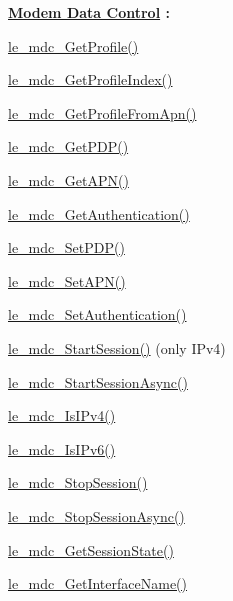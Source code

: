 {\bfseries \hyperlink{c_mdc}{Modem Data Control} \+:}
\begin{DoxyItemize}
\item \hyperlink{le__mdc__interface_8h_a638b693cd5f644fa5c24f81e1e36483c}{le\+\_\+mdc\+\_\+\+Get\+Profile()}
\item \hyperlink{le__mdc__interface_8h_a108f7c3db74a377c2ae5482543d4e0d9}{le\+\_\+mdc\+\_\+\+Get\+Profile\+Index()}
\item \hyperlink{le__mdc__interface_8h_a2ea0573e6e9cd16c04e95146f2b2e693}{le\+\_\+mdc\+\_\+\+Get\+Profile\+From\+Apn()}
\item \hyperlink{le__mdc__interface_8h_a0a51125579f1d5009dac03c79ddff498}{le\+\_\+mdc\+\_\+\+Get\+P\+D\+P()}
\item \hyperlink{le__mdc__interface_8h_afc0c149bfa4455f3e9a8ccc06f0c5fed}{le\+\_\+mdc\+\_\+\+Get\+A\+P\+N()}
\item \hyperlink{le__mdc__interface_8h_a3f83b1b922271091e3f1da418a4f39ca}{le\+\_\+mdc\+\_\+\+Get\+Authentication()}
\item \hyperlink{le__mdc__interface_8h_a73e66a7a63dc95d7f261fc2a26470386}{le\+\_\+mdc\+\_\+\+Set\+P\+D\+P()}
\item \hyperlink{le__mdc__interface_8h_ae8ebd11b9cb9afb9b6b5745903f50156}{le\+\_\+mdc\+\_\+\+Set\+A\+P\+N()}
\item \hyperlink{le__mdc__interface_8h_a9f69d0751927b5ead6c756202179b222}{le\+\_\+mdc\+\_\+\+Set\+Authentication()}
\item \hyperlink{le__mdc__interface_8h_a2cb08d5c3e6c43297d80448891719649}{le\+\_\+mdc\+\_\+\+Start\+Session()} (only I\+Pv4)
\item \hyperlink{le__mdc__interface_8h_aa03d6e31263ddf8bf1d94b183c9934d9}{le\+\_\+mdc\+\_\+\+Start\+Session\+Async()}
\item \hyperlink{le__mdc__interface_8h_aa3912e94864a6e5862e07f58b3772cba}{le\+\_\+mdc\+\_\+\+Is\+I\+Pv4()}
\item \hyperlink{le__mdc__interface_8h_adde11de0b17b2c937acca6355b6fba11}{le\+\_\+mdc\+\_\+\+Is\+I\+Pv6()}
\item \hyperlink{le__mdc__interface_8h_a53453f85065c3cace0922150b7e3d869}{le\+\_\+mdc\+\_\+\+Stop\+Session()}
\item \hyperlink{le__mdc__interface_8h_ac5b357f7437c9e253fa17b2511fa14ef}{le\+\_\+mdc\+\_\+\+Stop\+Session\+Async()}
\item \hyperlink{le__mdc__interface_8h_add91c364e8b3e4e82a0ce64e480c016b}{le\+\_\+mdc\+\_\+\+Get\+Session\+State()}
\item \hyperlink{le__mdc__interface_8h_a4c22a8691d6e6a69270a7ed6ab9974af}{le\+\_\+mdc\+\_\+\+Get\+Interface\+Name()}

\end{DoxyItemize}
